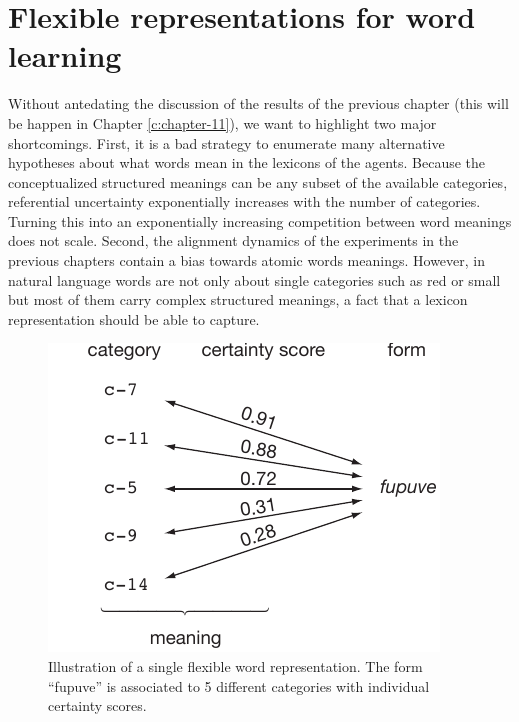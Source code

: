 
\setcounter{chapter}{5}

\chapter{Flexible representations for word learning}
\label{c:flexible}


Without antedating the discussion of the results of the previous
chapter (this will be happen in Chapter \ref{c:chapter-11}), we want
to highlight two major shortcomings. First, it is a bad strategy to
enumerate many alternative hypotheses about what words mean in the
lexicons of the agents. Because the conceptualized structured meanings
can be any subset of the available categories, referential uncertainty
exponentially increases with the number of categories. Turning this
into an exponentially increasing competition between word meanings
does not scale. Second, the alignment dynamics of the experiments in
the previous chapters contain a bias towards atomic words
meanings. However, in natural language words are not only about single
categories such as red or small but most of them carry complex
structured meanings, a fact that a lexicon representation should be
able to capture.


\begin{figure}[t]
  \includegraphics[width=0.43\linewidth]{figures/fwm-word}
  \caption{Illustration of a single flexible word representation. The
    form ``fupuve'' is associated to 5 different categories with
    individual certainty scores. }
\label{f:fwm-word}
\end{figure}


